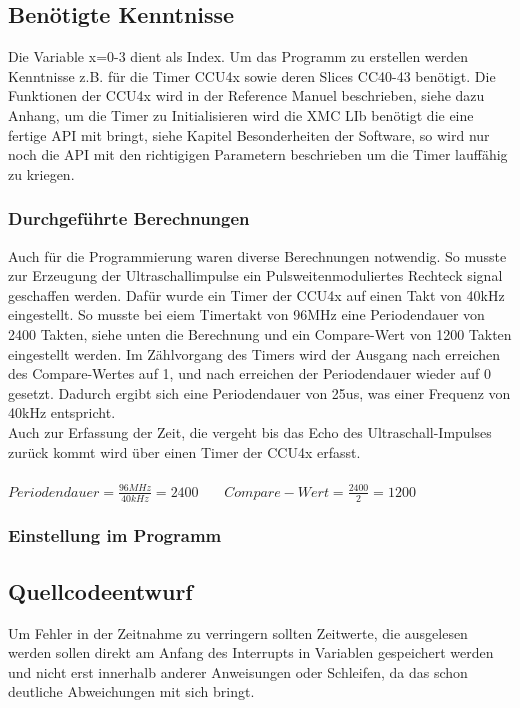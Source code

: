 \subsection{Benötigte Kenntnisse}
Die Variable x=0-3 dient als Index.
Um das Programm zu erstellen werden Kenntnisse z.B. für die Timer CCU4x sowie deren Slices CC40-43 benötigt. Die Funktionen der CCU4x wird in der Reference Manuel beschrieben, siehe dazu Anhang, um die Timer zu Initialisieren wird die XMC LIb benötigt die eine fertige API mit bringt, siehe Kapitel Besonderheiten der Software, so wird nur noch die API mit den richtigigen Parametern beschrieben um die Timer lauffähig zu kriegen. 

\subsubsection{Durchgeführte Berechnungen}
Auch für die Programmierung waren diverse Berechnungen notwendig. So musste zur Erzeugung der Ultraschallimpulse ein Pulsweitenmoduliertes Rechteck signal geschaffen werden. Dafür wurde ein Timer der CCU4x auf einen Takt von 40kHz eingestellt. So musste bei eiem Timertakt von 96MHz eine Periodendauer von 2400 Takten, siehe unten die Berechnung und ein Compare-Wert von 1200 Takten eingestellt werden. Im Zählvorgang des Timers wird der Ausgang nach erreichen des Compare-Wertes auf 1, und nach erreichen der Periodendauer wieder auf 0 gesetzt. Dadurch ergibt sich eine Periodendauer von 25us, was einer Frequenz von 40kHz entspricht.\\
Auch zur Erfassung der Zeit, die vergeht bis das Echo des Ultraschall-Impulses zurück kommt wird über einen Timer der CCU4x erfasst. 
\onehalfspacing \\ \\
\(\displaystyle Periodendauer=\frac{96MHz}{40kHz} = 2400 \)  \  \  \    \(\displaystyle Compare-Wert=\frac{2400}{2} = 1200 \) 
\singlespacing
\subsubsection{Einstellung im Programm}

\subsection{Quellcodeentwurf}
Um Fehler in der Zeitnahme zu verringern sollten Zeitwerte, die ausgelesen werden sollen direkt am Anfang des Interrupts in Variablen gespeichert werden und nicht erst innerhalb anderer Anweisungen oder Schleifen, da das schon deutliche Abweichungen mit sich bringt.\\

